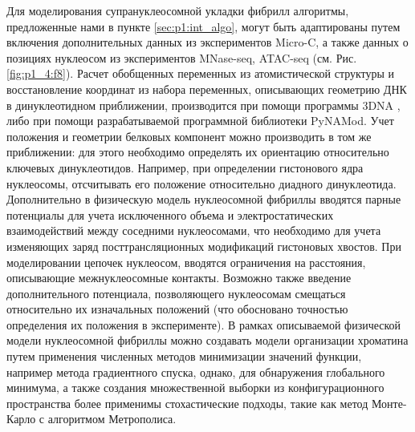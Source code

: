Для моделирования супрануклеосомной укладки фибрилл алгоритмы, предложенные нами в пункте \ref{sec:p1:int_algo}, могут быть адаптированы путем включения дополнительных данных из экспериментов Micro-C, а также данных о позициях нуклеосом из экспериментов MNase-seq, ATAC-seq (см. Рис. \ref{fig:p1_4:f8}). 
     Расчет обобщенных переменных из атомистической структуры и восстановление координат из набора переменных, описывающих геометрию ДНК в динуклеотидном приближении, производится при помощи программы 3DNA \cite{lu_3dna_2003}, либо при помощи разрабатываемой программной библиотеки PyNAMod.      Учет положения и геометрии белковых компонент можно производить в том же приближении: для этого необходимо определять их ориентацию относительно ключевых динуклеотидов. Например, при определении гистонового ядра нуклеосомы, отсчитывать его положение относительно диадного динуклеотида.
    Дополнительно в физическую модель нуклеосомной фибриллы вводятся парные потенциалы для учета исключенного объема и электростатических взаимодействий между соседними нуклеосомами, что необходимо для учета изменяющих заряд посттрансляционных модификаций гистоновых хвостов.
     При моделировании цепочек нуклеосом, вводятся ограничения на расстояния, описывающие межнуклеосомные контакты. Возможно также введение дополнительного потенциала, позволяющего нуклеосомам смещаться относительно их изначальных положений (что обосновано точностью определения их положения в эксперименте).   В рамках описываемой физической модели нуклеосомной фибриллы можно создавать модели организации хроматина путем применения численных методов минимизации значений функции, например метода градиентного спуска, однако, для обнаружения глобального минимума, а также создания множественной выборки из конфигурационного пространства более применимы стохастические подходы, такие как метод  Монте-Карло с алгоритмом Метрополиса.

